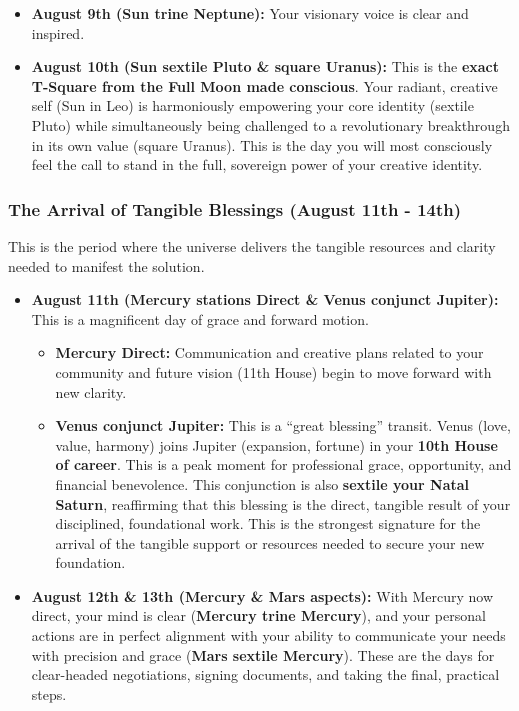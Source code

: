\documentclass{article}
\begin{document}
\begin{itemize}
\item
  \textbf{August 9th (Sun trine Neptune):} Your visionary voice is clear and inspired.
\item
  \textbf{August 10th (Sun sextile Pluto \& square Uranus):} This is the \textbf{exact T-Square from the Full Moon made conscious}. Your radiant, creative self (Sun in Leo) is harmoniously empowering your core identity (sextile Pluto) while simultaneously being challenged to a revolutionary breakthrough in its own value (square Uranus). This is the day you will most consciously feel the call to stand in the full, sovereign power of your creative identity.
\end{itemize}

\subsubsection*{The Arrival of Tangible Blessings (August 11th - 14th)}\label{the-arrival-of-tangible-blessings-august-11th---14th}

This is the period where the universe delivers the tangible resources and clarity needed to manifest the solution.

\begin{itemize}
\tightlist
\item
  \textbf{August 11th (Mercury stations Direct \& Venus conjunct Jupiter):} This is a magnificent day of grace and forward motion.

  \begin{itemize}
  \tightlist
  \item
    \textbf{Mercury Direct:} Communication and creative plans related to your community and future vision (11th House) begin to move forward with new clarity.
  \item
    \textbf{Venus conjunct Jupiter:} This is a ``great blessing'' transit. Venus (love, value, harmony) joins Jupiter (expansion, fortune) in your \textbf{10th House of career}. This is a peak moment for professional grace, opportunity, and financial benevolence. This conjunction is also \textbf{sextile your Natal Saturn}, reaffirming that this blessing is the direct, tangible result of your disciplined, foundational work. This is the strongest signature for the arrival of the tangible support or resources needed to secure your new foundation.
  \end{itemize}
\item
  \textbf{August 12th \& 13th (Mercury \& Mars aspects):} With Mercury now direct, your mind is clear (\textbf{Mercury trine Mercury}), and your personal actions are in perfect alignment with your ability to communicate your needs with precision and grace (\textbf{Mars sextile Mercury}). These are the days for clear-headed negotiations, signing documents, and taking the final, practical steps.
\end{itemize}
\end{document}
